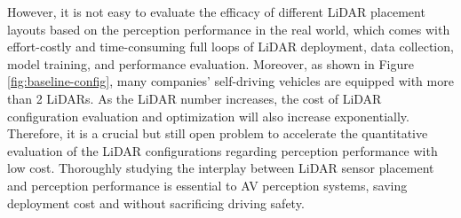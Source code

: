 \documentclass[10pt,twocolumn,letterpaper]{article}
\begin{document}
However, it is not easy to evaluate the efficacy of different LiDAR placement layouts based on the perception performance in the real world, which comes with effort-costly and time-consuming full loops of LiDAR deployment, data collection, model training, and performance evaluation.
Moreover, as shown in Figure \ref{fig:baseline-config}, many companies' self-driving vehicles are equipped with more than 2 LiDARs. As the LiDAR number increases, the cost of LiDAR configuration evaluation and optimization will also increase exponentially.
Therefore, it is a crucial but still open problem to accelerate the quantitative evaluation of the LiDAR configurations regarding perception performance with low cost. Thoroughly studying the interplay between LiDAR sensor placement and perception performance is essential to AV perception systems, saving deployment cost and without sacrificing driving safety.

\end{document}
